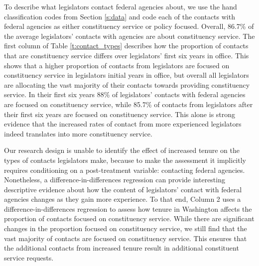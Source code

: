 \documentclass{article}
\begin{document}
\begin{table}
\begin{center}
\begin{minipage}{\textwidth}
\caption{The Effect of Prestige and Tenure on the Types of Contact with Federal Agencies} \label{t:contact_types}

\end{minipage}
\end{center}
\end{table}

To describe what legislators contact federal agencies about, we use the hand classification codes from Section \ref{s:data} and code each of the contacts with federal agencies as either constituency service or policy focused.  Overall, 86.7\% of the average legislators' contacts with agencies are about constituency service.  The first column of Table \ref{t:contact_types} describes how the proportion of contacts that are constituency service differs over legislators' first six years in office. This shows that a higher proportion of contacts from legislators are focused on constituency service in legislators initial years in office, but overall all legislators are allocating the vast majority of their contacts towards providing constituency service.  In their first six years 88\% of legislators' contacts with federal agencies are focused on constituency service, while 85.7\% of contacts from legislators after their first six years are focused on constituency service.  This alone is strong evidence that the increased rates of contact from more experienced legislators indeed translates into more constituency service.   

Our research design is unable to identify the effect of increased tenure on the types of contacts legislators make, because to make the assessment it implicitly requires conditioning on a post-treatment variable: contacting federal agencies.  Nonetheless, a difference-in-differences regression can provide interesting descriptive evidence about how the content of legislators' contact with federal agencies changes as they gain more experience.  To that end, Column 2 uses a difference-in-differences regression to assess how tenure in Washington affects the proportion of contacts focused on constituency service. While there are significant changes in the proportion focused on constituency service, we still find that the vast majority of contacts are focused on constituency service.  This ensures that the additional contacts from increased tenure result in additional constituent service requests. 
\end{document}
